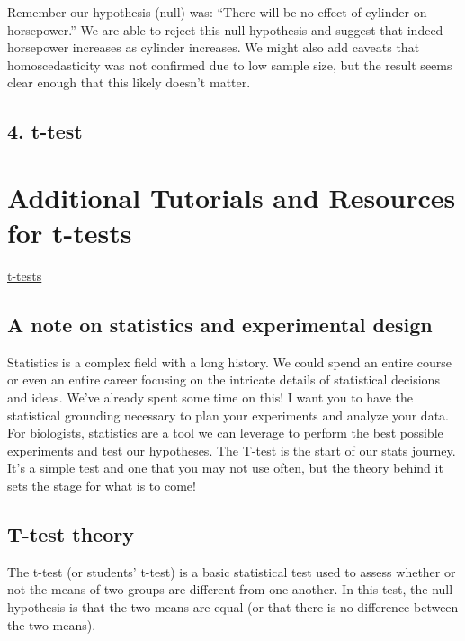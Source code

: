 \documentclass[
  letterpaper,
  DIV=11,
  numbers=noendperiod]{scrartcl}
\begin{document}
Remember our hypothesis (null) was: ``There will be no effect of
cylinder on horsepower.'' We are able to reject this null hypothesis and
suggest that indeed horsepower increases as cylinder increases. We might
also add caveats that homoscedasticity was not confirmed due to low
sample size, but the result seems clear enough that this likely doesn't
matter.\\

\hypertarget{t-test}{%
\subsection{\texorpdfstring{\textbf{4.
t-test}}{4. t-test}}\label{t-test}}

\hypertarget{additional-tutorials-and-resources-for-t-tests}{%
\section{Additional Tutorials and Resources for
t-tests}\label{additional-tutorials-and-resources-for-t-tests}}

\href{https://statistics.berkeley.edu/computing/r-t-tests}{t-tests}

\subsection{\texorpdfstring{\textbf{A note on statistics and
experimental design}}{A note on statistics and experimental design}}

Statistics is a complex field with a long history. We could spend an
entire course or even an entire career focusing on the intricate details
of statistical decisions and ideas. We've already spent some time on
this! I want you to have the statistical grounding necessary to plan
your experiments and analyze your data. For biologists, statistics are a
tool we can leverage to perform the best possible experiments and test
our hypotheses. The T-test is the start of our stats journey. It's a
simple test and one that you may not use often, but the theory behind it
sets the stage for what is to come!

\hfill\break

\subsection{\texorpdfstring{\textbf{T-test theory}}{T-test theory}}

The t-test (or students' t-test) is a basic statistical test used to
assess whether or not the means of two groups are different from one
another. In this test, the null hypothesis is that the two means are
equal (or that there is no difference between the two means).
\end{document}
